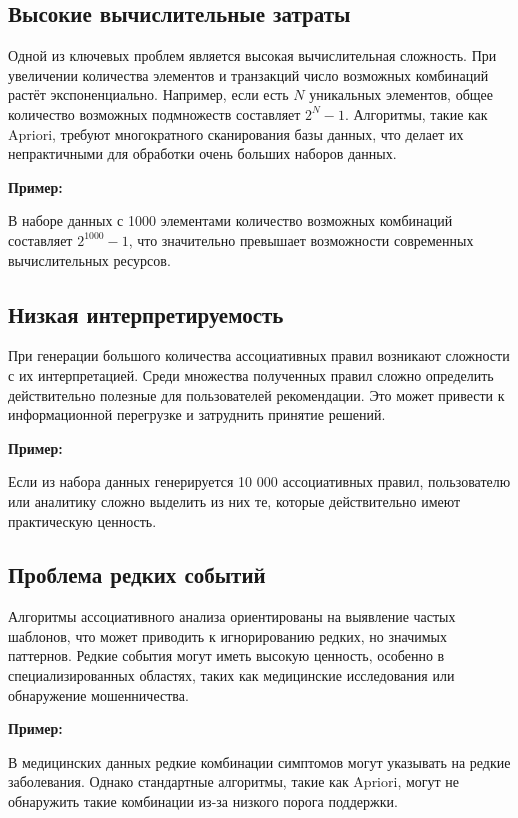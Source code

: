 \subsection{Высокие вычислительные затраты}

Одной из ключевых проблем является высокая вычислительная сложность. При увеличении количества элементов и транзакций число возможных комбинаций растёт экспоненциально. Например, если есть $N$ уникальных элементов, общее количество возможных подмножеств составляет $2^N - 1$. Алгоритмы, такие как Apriori, требуют многократного сканирования базы данных, что делает их непрактичными для обработки очень больших наборов данных.

\textbf{Пример:}

В наборе данных с 1000 элементами количество возможных комбинаций составляет $2^{1000} - 1$, что значительно превышает возможности современных вычислительных ресурсов.

\subsection{Низкая интерпретируемость}

При генерации большого количества ассоциативных правил возникают сложности с их интерпретацией. Среди множества полученных правил сложно определить действительно полезные для пользователей рекомендации. Это может привести к информационной перегрузке и затруднить принятие решений.

\textbf{Пример:}

Если из набора данных генерируется 10 000 ассоциативных правил, пользователю или аналитику сложно выделить из них те, которые действительно имеют практическую ценность.

\subsection{Проблема редких событий}

Алгоритмы ассоциативного анализа ориентированы на выявление частых шаблонов, что может приводить к игнорированию редких, но значимых паттернов. Редкие события могут иметь высокую ценность, особенно в специализированных областях, таких как медицинские исследования или обнаружение мошенничества.

\textbf{Пример:}

В медицинских данных редкие комбинации симптомов могут указывать на редкие заболевания. Однако стандартные алгоритмы, такие как Apriori, могут не обнаружить такие комбинации из-за низкого порога поддержки.

